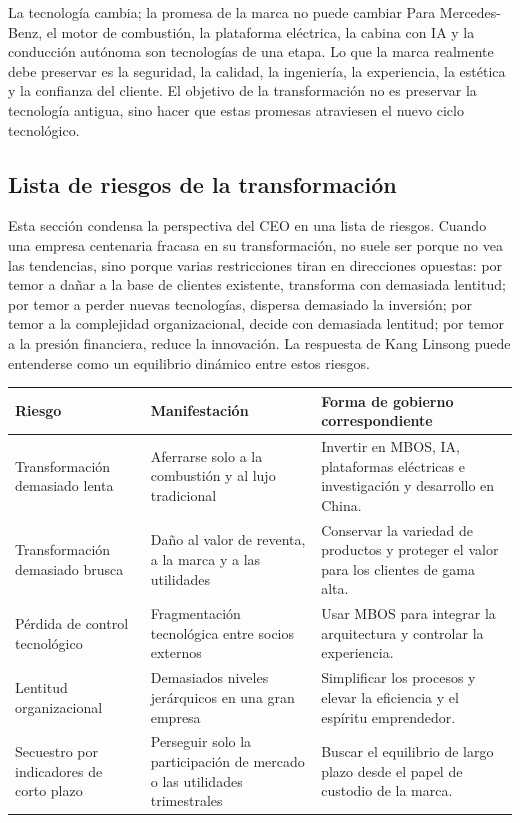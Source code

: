 \begin{importantbox}{La tecnología cambia; la promesa de la marca no puede cambiar}
Para Mercedes-Benz, el motor de combustión, la plataforma eléctrica, la cabina con IA y la conducción autónoma son tecnologías de una etapa. Lo que la marca realmente debe preservar es la seguridad, la calidad, la ingeniería, la experiencia, la estética y la confianza del cliente. El objetivo de la transformación no es preservar la tecnología antigua, sino hacer que estas promesas atraviesen el nuevo ciclo tecnológico.
\end{importantbox}

\subsection{Lista de riesgos de la transformación}

Esta sección condensa la perspectiva del CEO en una lista de riesgos. Cuando una empresa centenaria fracasa en su transformación, no suele ser porque no vea las tendencias, sino porque varias restricciones tiran en direcciones opuestas: por temor a dañar a la base de clientes existente, transforma con demasiada lentitud; por temor a perder nuevas tecnologías, dispersa demasiado la inversión; por temor a la complejidad organizacional, decide con demasiada lentitud; por temor a la presión financiera, reduce la innovación. La respuesta de Kang Linsong puede entenderse como un equilibrio dinámico entre estos riesgos.

\noindent\begin{tabularx}{\textwidth}{p{}p{}X}
\toprule
Riesgo & Manifestación & Forma de gobierno correspondiente \\
\midrule
Transformación demasiado lenta & Aferrarse solo a la combustión y al lujo tradicional & Invertir en MBOS, IA, plataformas eléctricas e investigación y desarrollo en China. \\
Transformación demasiado brusca & Daño al valor de reventa, a la marca y a las utilidades & Conservar la variedad de productos y proteger el valor para los clientes de gama alta. \\
Pérdida de control tecnológico & Fragmentación tecnológica entre socios externos & Usar MBOS para integrar la arquitectura y controlar la experiencia. \\
Lentitud organizacional & Demasiados niveles jerárquicos en una gran empresa & Simplificar los procesos y elevar la eficiencia y el espíritu emprendedor. \\
Secuestro por indicadores de corto plazo & Perseguir solo la participación de mercado o las utilidades trimestrales & Buscar el equilibrio de largo plazo desde el papel de custodio de la marca. \\
\bottomrule
\end{tabularx}


